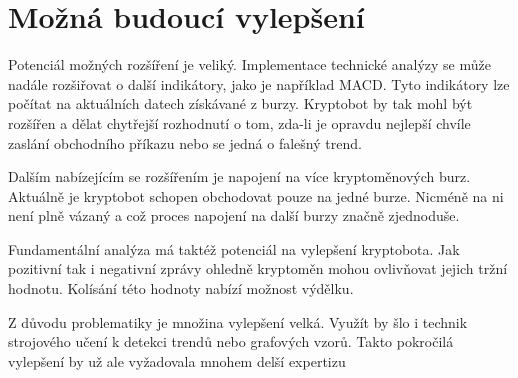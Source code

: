\section{Možná budoucí vylepšení}
Potenciál možných rozšíření je veliký. Implementace technické analýzy se může nadále rozšiřovat o další indikátory, jako je například MACD. Tyto indikátory lze počítat na aktuálních datech získávané z burzy.
Kryptobot by tak mohl být rozšířen a dělat chytřejší rozhodnutí o tom, zda-li je opravdu nejlepší chvíle zaslání obchodního příkazu nebo se jedná o falešný trend.

Dalším nabízejícím se rozšířením je napojení na více kryptoměnových burz. Aktuálně je kryptobot schopen obchodovat pouze na jedné burze. Nicméně na ni není plně vázaný a což proces napojení na další
burzy značně zjednoduše.

Fundamentální analýza má taktéž potenciál na vylepšení kryptobota. Jak pozitivní tak i negativní zprávy ohledně kryptoměn mohou ovlivňovat jejich tržní hodnotu. Kolísání této hodnoty nabízí možnost
výdělku.

Z důvodu problematiky je množina vylepšení velká. Využít by šlo i technik strojového učení k detekci trendů nebo grafových vzorů. Takto pokročilá vylepšení by už ale vyžadovala mnohem delší expertizu

